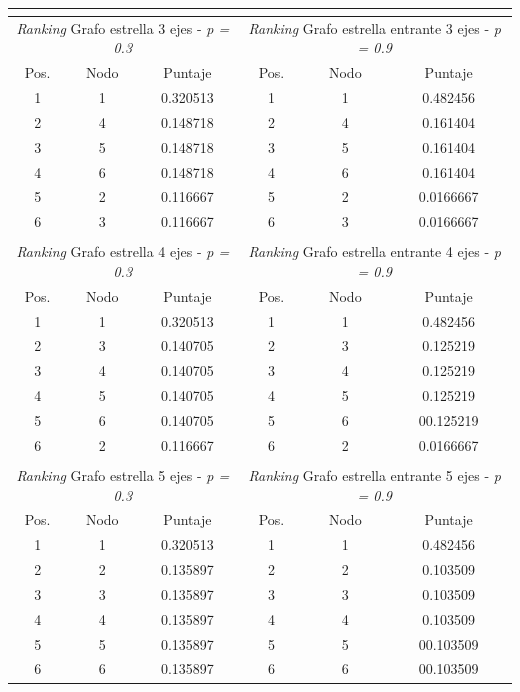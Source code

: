 \begin{center}
\begin{tabular}{|c|c|c||c|c|c|}
                    \multicolumn{3}{c}{} \\ \hline
                    \multicolumn{3}{|c||}{\emph{Ranking} Grafo estrella 3 ejes - \emph{p = 0.3}} & \multicolumn{3}{c|}{\emph{Ranking} Grafo estrella entrante 3 ejes - \emph{p = 0.9}} \\ \hline
                    Pos. & Nodo & Puntaje    & Pos. & Nodo & Puntaje  \\ \hline 


1 & 1 & 0.320513 & 1 & 1 & 0.482456 \\ 
2 & 4 & 0.148718 & 2 & 4 &  0.161404 \\
3 & 5 & 0.148718  & 3 & 5 &  0.161404 \\
4 & 6 & 0.148718  & 4 & 6 &  0.161404 \\
5 & 2 & 0.116667 & 5 & 2 &  0.0166667 \\
6 & 3 & 0.116667 & 6 & 3 & 0.0166667 \\ \hline

                    \multicolumn{3}{c}{} \\ \hline
                    \multicolumn{3}{|c||}{\emph{Ranking} Grafo estrella 4 ejes - \emph{p = 0.3}} & \multicolumn{3}{c|}{\emph{Ranking} Grafo estrella entrante 4 ejes - \emph{p = 0.9}} \\ \hline
                    Pos. & Nodo & Puntaje    & Pos. & Nodo & Puntaje  \\ \hline 

1 & 1 & 0.320513 & 1 & 1 & 0.482456 \\ 
2 & 3 & 0.140705 & 2 & 3 &  0.125219 \\
3 & 4 & 0.140705  & 3 & 4 &  0.125219 \\
4 & 5 & 0.140705  & 4 & 5 &  0.125219 \\
5 & 6 & 0.140705 & 5 & 6 &  00.125219 \\
6 & 2 & 0.116667 & 6 & 2 & 0.0166667 \\ \hline

                    \multicolumn{3}{c}{} \\ \hline
                    \multicolumn{3}{|c||}{\emph{Ranking} Grafo estrella 5 ejes - \emph{p = 0.3}} & \multicolumn{3}{c|}{\emph{Ranking} Grafo estrella entrante 5 ejes - \emph{p = 0.9}} \\ \hline
                    Pos. & Nodo & Puntaje    & Pos. & Nodo & Puntaje  \\ \hline 

1 & 1 & 0.320513 & 1 & 1 & 0.482456 \\ 
2 & 2 & 0.135897 & 2 & 2 &  0.103509 \\
3 & 3 & 0.135897  & 3 & 3 &  0.103509 \\
4 & 4 & 0.135897  & 4 & 4 &  0.103509 \\
5 & 5 & 0.135897 & 5 & 5 &  00.103509 \\
6 & 6 & 0.135897 & 6 & 6 & 00.103509 \\ \hline

                \end{tabular}
            \end{center} 
            
